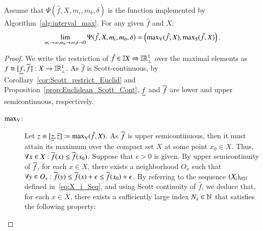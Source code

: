 \documentclass[11pt,times]{article}
\begin{document}
\begin{theorem}
  \label{thm:completeness}
  Assume that $\Psi(\hat{f}, X, m_{\iota}, m_b, \delta)$ is the function
  implemented by Algorithm~\ref{alg:interval_max}. For any given $\hat{f}$
  and $X$:
%
  \begin{equation*}
    \lim_{m_{\iota} \to \infty, m_b \to \infty, \delta \to 0} \Psi(\hat{f}, X,
    m_{\iota}, m_b, \delta) = \left( \maxV(\hat{f},X), \maxS(\hat{f},X) \right).
  \end{equation*}
\end{theorem}


\begin{proof}
  We write the restriction of
  $\hat{f} \in \intvaldom[X] \Rightarrow \intvaldom[\R^1\lift]$ over the
  maximal elements as
  $f \equiv [\lep[f], \uep[f]]: X \to \intvaldom[\R^1\lift]$. As
  $\hat{f}$ is Scott-continuous, by
  Corollary~\ref{cor:Scott_restrict_Euclid} and
  Proposition~\ref{prop:Euclidean_Scott_Cont}, $\lep[f]$ and $\uep[f]$
  are lower and upper semicontinuous, respectively.

  
  \begin{description}
  \item[$\maxV$:]   Let $z \equiv [\lep[z], \uep[z]] \defeq \maxV(\hat{f},X)$. As
  $\uep[f]$ is upper semicontinuous, then it must attain its maximum
  over the compact set $X$ at some point $x_0 \in X$. Thus,
  $\forall x \in X: \uep[f](x) \leq \uep[f](x_0)$. Suppose that
  $\epsilon > 0$ is given. By upper semicontinuity of $\uep[f]$, for
  each $x \in X$, there exists a neighborhood $O_x$ such that
  $\forall y \in O_x: \uep[f](y) \leq \uep[f](x) + \epsilon \leq
  \uep[f](x_0) + \epsilon$. By referring to the sequence
  $(X_i)_{i \in \N}$ defined in~\eqref{eq:X_i_Seq}, and using Scott
  continuity of $\hat{f}$, we deduce that, for each $x \in X$, there
  exists a sufficiently large index $N_x \in \N$ that satisfies the
  following property:



\end{description}
\end{proof}
\end{document}
